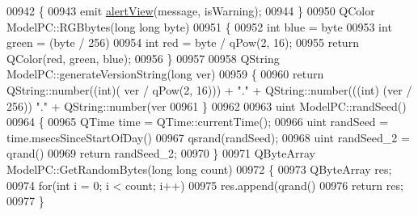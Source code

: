 \begin{DoxyCode}
{00942 \{
00943     emit \hyperlink{class_model_p_c_af0217a7ca5671e26090dc50a5dccdaf5}{alertView}(message, isWarning);
00944 \}
00950 QColor ModelPC::RGBbytes(\textcolor{keywordtype}{long} \textcolor{keywordtype}{long} byte)
00951 \{
00952     \textcolor{keywordtype}{int} blue = byte %
00953     \textcolor{keywordtype}{int} green = (byte / 256) %
00954     \textcolor{keywordtype}{int} red = byte / qPow(2, 16);
00955     \textcolor{keywordflow}{return} QColor(red, green, blue);
00956 \}
00957 
00958 QString ModelPC::generateVersionString(\textcolor{keywordtype}{long} ver)
00959 \{
00960     \textcolor{keywordflow}{return} QString::number((\textcolor{keywordtype}{int})( ver / qPow(2, 16))) + \textcolor{stringliteral}{"."} + QString::number(((\textcolor{keywordtype}{int}) (ver / 256)) %
      "."} + QString::number(ver %
00961 \}
00962 
00963 uint ModelPC::randSeed()
00964 \{
00965     QTime time = QTime::currentTime();
00966     uint randSeed = time.msecsSinceStartOfDay() %
00967     qsrand(randSeed);
00968     uint randSeed\_2 = qrand() %
00969     \textcolor{keywordflow}{return} randSeed\_2;
00970 \}
00971 QByteArray ModelPC::GetRandomBytes(\textcolor{keywordtype}{long} \textcolor{keywordtype}{long} count)
00972 \{
00973     QByteArray res;
00974     \textcolor{keywordflow}{for}(\textcolor{keywordtype}{int} i = 0; i < count; i++)
00975        res.append(qrand() %
00976     \textcolor{keywordflow}{return} res;
00977 \}
\end{DoxyCode}
